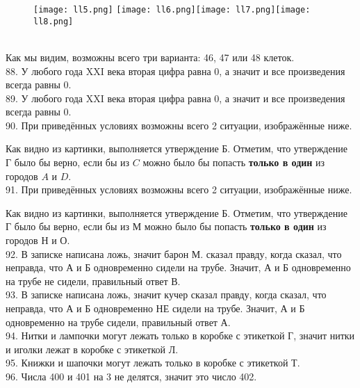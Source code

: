 \begin{figure}[ht!]\texttt{[image: ll5.png]} \texttt{[image: ll6.png]}\texttt{[image: ll7.png]}\texttt{[image: ll8.png]}
\end{figure}\\
Как мы видим, возможны всего три варианта: 46, 47 или 48 клеток.\\
88. У любого года XXI века вторая цифра равна 0, а значит и все произведения всегда равны 0.\\
89. У любого года XXI века вторая цифра равна 0, а значит и все произведения всегда равны 0.\\
90. При приведённых условиях возможны всего 2 ситуации, изображённые ниже.
\begin{center}
\begin{figure}[ht!]
\end{figure}
\end{center}
Как видно из картинки, выполняется утверждение Б. Отметим, что утверждение Г было бы верно, если бы из $C$ можно было бы попасть {\bf только в один} из городов $A$ и $D.$\\
91. При приведённых условиях возможны всего 2 ситуации, изображённые ниже.
\begin{center}
\begin{figure}[ht!]
\end{figure}
\end{center}
Как видно из картинки, выполняется утверждение Б. Отметим, что утверждение Г было бы верно, если бы из М можно было бы попасть {\bf только в один} из городов Н и О.\\
92. В записке написана ложь, значит барон М. сказал правду, когда сказал, что неправда, что А и Б одновременно сидели на трубе. Значит, А и Б одновременно на трубе не сидели, правильный ответ В.\\
93. В записке написана ложь, значит кучер сказал правду, когда сказал, что неправда, что А и Б одновременно НЕ сидели на трубе. Значит, А и Б одновременно на трубе сидели, правильный ответ А.\\
94. Нитки и лампочки могут лежать только в коробке с этикеткой Г, значит нитки и иголки лежат в коробке с этикеткой Л.\\
95. Книжки и шапочки могут лежать только в коробке с этикеткой Т.\\
96. Числа 400 и 401 на 3 не делятся, значит это число 402.\\
